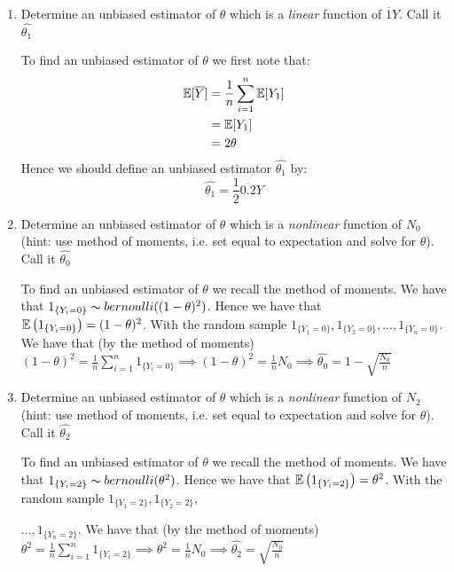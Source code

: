 \documentclass[12pt, a4paper]{article}
\begin{document}
\begin{enumerate}[label={\bfseries\arabic*.}]
\item Determine an unbiased estimator of $\theta$ which is a \textit{linear} function of $\overbar{1}{Y}$. Call it $\hat{\theta_1}$

{\setlength{\leftskip}{3ex}

To find an unbiased estimator of $\theta$ we first note that:
\begin{align*}
\E[\overbar{0.5}{Y}] & = \frac{1}{n}\sum_{i = 1}^n\E[Y_1]\\
& = \E[Y_1] \\
& = 2\theta
\end{align*}
Hence we should define an unbiased estimator $\hat{\theta_1}$ by: 
$$\hat{\theta_1} = \frac{1}{2}\overbar{0.2}{Y}$$
}
\item Determine an unbiased estimator of $\theta$ which is a \textit{nonlinear} function of $N_0$ (hint: use method of moments, i.e. set equal to expectation and solve for $\theta$). Call it $\hat{\theta_0}$

{\setlength{\leftskip}{3ex}

To find an unbiased estimator of $\theta$ we recall the method of moments. We have that $1_{\{Y_i = 0\}} \thicksim bernoulli((1 - \theta)^2)$. Hence we have that $\operatorname{\mathbb{E}}\left(1_{\{Y_i = 0\}}\right) = (1 - \theta)^2$. With the random sample $1_{\{Y_1 = 0\}}, 1_{\{Y_2 = 0\}}, ..., 1_{\{Y_n = 0\}}$. We have that (by the method of moments) $ (1 - \theta)^2 = \frac{1}{n}\sum_{i = 1}^n 1_{\{Y_i = 0\}} \implies (1 - \theta)^2 = \frac{1}{n}N_0 \implies \hat{\theta_0} = 1 - \sqrt{\frac{N_0}{n}}$

}

\item Determine an unbiased estimator of $\theta$ which is a \textit{nonlinear} function of $N_2$ (hint: use method of moments, i.e. set equal to expectation and solve for $\theta$). Call it $\hat{\theta_2}$

{\setlength{\leftskip}{3ex}

To find an unbiased estimator of $\theta$ we recall the method of moments. We have that $1_{\{Y_i = 2\}} \thicksim bernoulli(\theta^2)$. Hence we have that $\operatorname{\mathbb{E}}\left(1_{\{Y_i = 2\}}\right) =\theta^2$. With the random sample $1_{\{Y_1 = 2\}}, 1_{\{Y_2 = 2\}},$ 

$..., 1_{\{Y_n = 2\}}$. We have that (by the method of moments) $ \theta^2 = \frac{1}{n}\sum_{i = 1}^n 1_{\{Y_i = 2\}} \implies \theta^2 = \frac{1}{n}N_0 \implies \hat{\theta_2} = \sqrt{\frac{N_0}{n}}$

}
\end{enumerate}
\end{document}

